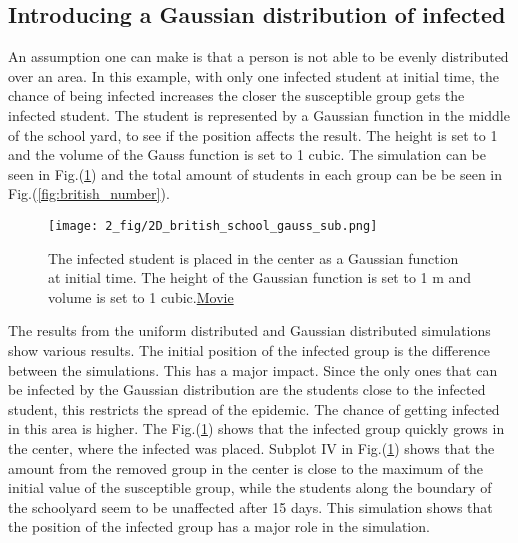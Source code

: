 \documentclass[%
twoside,                 %
final,                   %
chapterprefix=true,      %
open=right               %
10pt]{book}
\begin{document}
\subsection{Introducing a Gaussian distribution of infected}
An assumption one can make is that a person is not able to be evenly distributed over an area. In this example, with only one infected student at initial time, the chance of being infected increases the closer the susceptible group gets the infected student. The student is represented by a Gaussian function in the middle of the school yard, to see if the position affects the result. The height is set to 1 and the volume of the Gauss function is set to 1 cubic. The simulation can be seen in Fig.(\ref{fig:gauss_sub}) and the total amount of students in each group can be be seen in Fig.(\ref{fig:british_number}).


\begin{figure}[ht]
  \centerline{\texttt{[image: 2\_fig/2D\_british\_school\_gauss\_sub.png]}}
  \caption{
  \label{fig:gauss_sub} The infected student is placed in the center as a Gaussian function at initial time. The height of the Gaussian function is set to 1 m and volume is set to 1 cubic.\href{{https://torbjornseland.github.io/master}}{Movie}
  }
\end{figure}




\vspace{3mm}




\vspace{3mm}


The results from the uniform distributed and Gaussian distributed simulations show various results. The initial position of the infected group is the difference between the simulations. This has a major impact. Since the only ones that can be infected by the Gaussian distribution are the students close to the infected student, this restricts the spread of the epidemic. The chance of getting infected in this area is higher. The Fig.(\ref{fig:gauss_sub}) shows that the infected group quickly grows in the center, where the infected was placed. Subplot IV in Fig.(\ref{fig:gauss_sub}) shows that the amount from the removed group in the center is close to the maximum of the initial value of  the susceptible group, while the students along the boundary of the schoolyard seem to be unaffected after 15 days. This simulation shows that the position of the infected group has a major role in the simulation.
\end{document}
